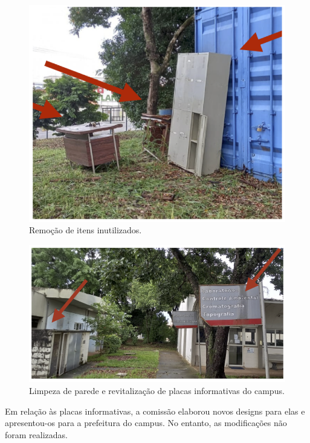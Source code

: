 \documentclass[
  letterpaper,
  DIV=11,
  numbers=noendperiod]{scrreprt}
\begin{document}
\begin{figure}[H]

{\centering \includegraphics[width=0.6\linewidth,height=\textheight,keepaspectratio]{recomendacoes/melhoria-2.png}

}

\caption{Remoção de itens inutilizados.}

\end{figure}%

\begin{figure}[H]

{\centering \includegraphics[width=0.6\linewidth,height=\textheight,keepaspectratio]{recomendacoes/melhoria-3.png}

}

\caption{Limpeza de parede e revitalização de placas informativas do
campus.}

\end{figure}%

Em relação às placas informativas, a comissão elaborou novos designs
para elas e apresentou-os para a prefeitura do campus. No entanto, as
modificações não foram realizadas.
\end{document}
